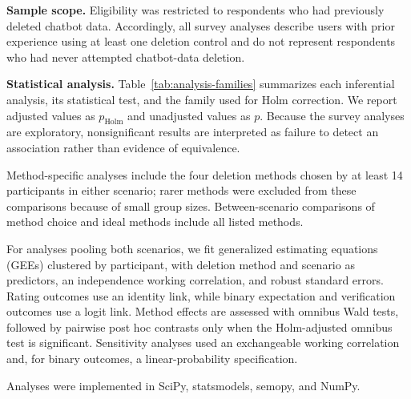 \documentclass[conference,compsoc]{IEEEtran}
\begin{document}
\textbf{Sample scope.} Eligibility was restricted to respondents who had previously deleted chatbot data. Accordingly, all survey analyses describe users with prior experience using at least one deletion control and do not represent respondents who had never attempted chatbot-data deletion.

\textbf{Statistical analysis.} Table~\ref{tab:analysis-families} summarizes each inferential analysis, its statistical test, and the family used for Holm correction. We report adjusted values as $p_{\mathrm{Holm}}$ and unadjusted values as $p$. Because the survey analyses are exploratory, nonsignificant results are interpreted as failure to detect an association rather than evidence of equivalence.

Method-specific analyses include the four deletion methods chosen by at least 14 participants in either scenario; rarer methods were excluded from these comparisons because of small group sizes. Between-scenario comparisons of method choice and ideal methods include all listed methods.

For analyses pooling both scenarios, we fit generalized estimating equations (GEEs) clustered by participant, with deletion method and scenario as predictors, an independence working correlation, and robust standard errors. Rating outcomes use an identity link, while binary expectation and verification outcomes use a logit link. Method effects are assessed with omnibus Wald tests, followed by pairwise post hoc contrasts only when the Holm-adjusted omnibus test is significant. Sensitivity analyses used an exchangeable working correlation and, for binary outcomes, a linear-probability specification.

Analyses were implemented in SciPy, statsmodels, semopy, and NumPy.
\end{document}
